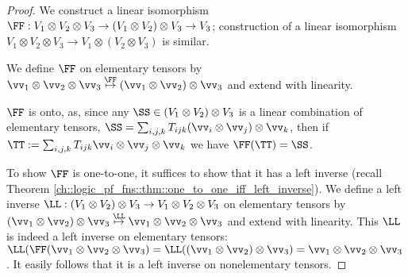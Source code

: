 \begin{proof}
    We construct a linear isomorphism $\FF:V_1 \otimes V_2 \otimes V_3 \rightarrow (V_1 \otimes V_2) \otimes V_3 \rightarrow V_3$; construction of a linear isomorphism $V_1 \otimes V_2 \otimes V_3 \rightarrow V_1 \otimes (V_2 \otimes V_3)$ is similar.

    We define $\FF$ on elementary tensors by $\vv_1 \otimes \vv_2 \otimes \vv_3 \overset{\FF}{\mapsto} (\vv_1 \otimes \vv_2) \otimes \vv_3$ and extend with linearity.
    
    $\FF$ is onto, as, since any ${\SS \in (V_1 \otimes V_2) \otimes V_3}$ is a linear combination of elementary tensors, $\SS = \sum_{i, j, k} T_{ijk} (\vv_i \otimes \vv_j) \otimes \vv_k$, then if $\TT := \sum_{i,j,k} T_{ijk} \vv_i \otimes \vv_j \otimes \vv_k$ we have $\FF(\TT) = \SS$.


    To show $\FF$ is one-to-one, it suffices to show that it has a left inverse (recall Theorem \ref{ch::logic_pf_fns::thm::one_to_one_iff_left_inverse}). We define a left inverse $\LL:(V_1 \otimes V_2) \otimes V_3 \rightarrow V_1 \otimes V_2 \otimes V_3$ on elementary tensors by $(\vv_1 \otimes \vv_2) \otimes \vv_3 \overset{\LL}{\mapsto} \vv_1 \otimes \vv_2 \otimes \vv_3$ and extend with linearity. This $\LL$ is indeed a left inverse on elementary tensors: $\LL(\FF(\vv_1 \otimes \vv_2 \otimes \vv_3) = \LL((\vv_1 \otimes \vv_2) \otimes \vv_3) = \vv_1 \otimes \vv_2 \otimes \vv_3$. It easily follows that it is a left inverse on nonelementary tensors.
\end{proof}

